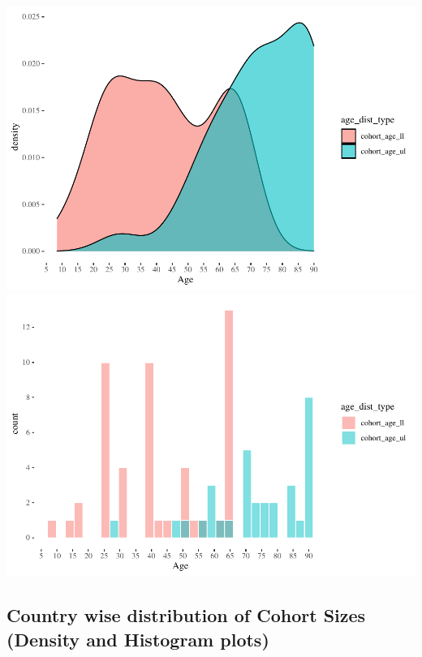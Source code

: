 \documentclass[
]{article}
\begin{document}
\includegraphics[width=1\linewidth]{man/figures/README-plot4_age_distribution_ll_ul-1}
\includegraphics[width=1\linewidth]{man/figures/README-plot4_age_distribution_ll_ul-2}

\hypertarget{country-wise-distribution-of-cohort-sizes-density-and-histogram-plots}{%
\subsection{Country wise distribution of Cohort Sizes (Density and
Histogram
plots)}\label{country-wise-distribution-of-cohort-sizes-density-and-histogram-plots}}
\end{document}
